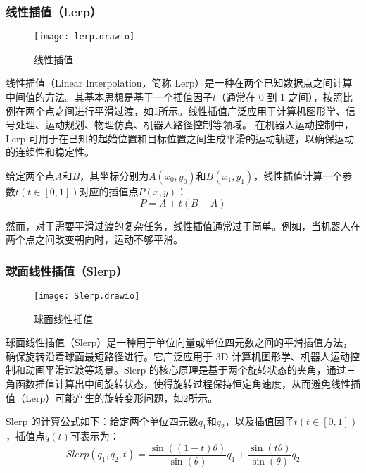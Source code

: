 \subsubsection{线性插值（Lerp）}
 \begin{figure}[htb]
	\texttt{[image: lerp.drawio]}
	\caption[线性插值]{线性插值} %
	\label{fig:lerp.drawio}
\end{figure}
线性插值（Linear Interpolation，简称 Lerp）是一种在两个已知数据点之间计算中间值的方法。其基本思想是基于一个插值因子$t$（通常在 0 到 1 之间），按照比例在两个点之间进行平滑过渡，如\cref{fig:lerp.drawio}所示。线性插值广泛应用于计算机图形学、信号处理、运动规划、物理仿真、机器人路径控制等领域。
在机器人运动控制中，Lerp 可用于在已知的起始位置和目标位置之间生成平滑的运动轨迹，以确保运动的连续性和稳定性。

给定两个点$A$和$B$，其坐标分别为$A(x_{0},y_{0})$和$B(x_{1},y_{1})$，线性插值计算一个参数$t(t\in[0,1])$对应的插值点$P(x,y)$：
\begin{equation}
	\label{equ:Lerp:1}
	P=A + t(B-A)
\end{equation}

然而，对于需要平滑过渡的复杂任务，线性插值通常过于简单。例如，当机器人在两个点之间改变朝向时，运动不够平滑。
\subsubsection{球面线性插值（Slerp）} 
 \begin{figure}[htb]
	\texttt{[image: Slerp.drawio]}
	\caption[球面线性插值]{球面线性插值} %
	\label{fig:Slerp.drawio}
\end{figure}
球面线性插值（Slerp）是一种用于单位向量或单位四元数之间的平滑插值方法，确保旋转沿着球面最短路径进行。它广泛应用于 3D 计算机图形学、机器人运动控制和动画平滑过渡等场景。Slerp 的核心原理是基于两个旋转状态的夹角，通过三角函数插值计算出中间旋转状态，使得旋转过程保持恒定角速度，从而避免线性插值（Lerp）可能产生的旋转变形问题，如\cref{fig:Slerp.drawio}所示。

Slerp 的计算公式如下：给定两个单位四元数$q_{1}$和$q_{2}$，以及插值因子$t(t\in[0,1])$，插值点$q(t)$可表示为：
\begin{equation}
	\label{equ:Slerp:1}
	Slerp(q_{1},q_{2},t)=\frac{\sin((1-t)\theta)}{\sin(\theta)}q_{1} + \frac{\sin(t\theta)}{\sin(\theta)}q_{2}
\end{equation}

